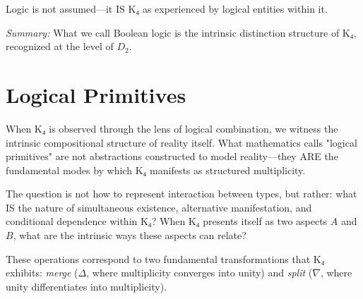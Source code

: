 \documentclass[11pt,a4paper]{book}
\begin{document}
Logic is not assumed—it IS K₄ as experienced by logical entities within it.

\medskip
\noindent\textit{Summary:} What we call Boolean logic is the intrinsic distinction structure of K₄, recognized at the level of $D_2$.

\chapter{Logical Primitives}

When K₄ is observed through the lens of logical combination, we witness the intrinsic compositional structure of reality itself. What mathematics calls "logical primitives" are not abstractions constructed to model reality—they ARE the fundamental modes by which K₄ manifests as structured multiplicity.

The question is not how to represent interaction between types, but rather: what IS the nature of simultaneous existence, alternative manifestation, and conditional dependence within K₄? When K₄ presents itself as two aspects $A$ and $B$, what are the intrinsic ways these aspects can relate?

These operations correspond to two fundamental transformations that K₄ exhibits: \emph{merge} ($\Delta$, where multiplicity converges into unity) and \emph{split} ($\nabla$, where unity differentiates into multiplicity).

\begin{center}
\end{center}
\end{document}
